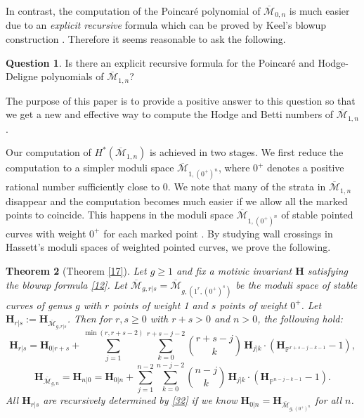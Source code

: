 \documentclass[11pt]{amsart}
\numberwithin{equation}{section}
\newtheorem{theo}{Theorem}[section]
\theoremstyle{definition}
\newtheorem{ques}[theo]{Question}
\newcommand{\PP}{\mathbb{P}}
\newcommand{\bH}{\mathbf{H}}
\def\cM{{\mathcal M}}
\def\beq{\begin{equation}}
\def\eeq{\end{equation}}
\def\bcM{\overline{\cM}}
\begin{document}
In contrast, the computation of the Poincar\'e polynomial of $\bcM_{0,n}$ is much easier due to an \emph{explicit recursive} formula \cite[(4.12)]{Manin} which can be proved by Keel's blowup construction \cite{Keel}.
Therefore it seems reasonable to ask the following.
\begin{ques}
    Is there an explicit recursive formula for the Poincar\'e and Hodge-Deligne polynomials of $\bcM_{1,n}$?
\end{ques}
The purpose of this paper is to provide a positive answer to this question so that we get a new and effective way to compute the Hodge and Betti numbers of $\bcM_{1,n}$. 

\medskip

Our computation of $H^*(\bcM_{1,n})$ is achieved in two stages. 
We first reduce the computation to a simpler moduli space $\bcM_{1,(0^+)^n}$, where $0^+$ denotes a positive rational number sufficiently close to $0$.  
We note that many of the strata in $\bcM_{1,n}$ disappear and the computation becomes much easier if we allow all the marked points to coincide. This happens in the moduli space $\bcM_{1,(0^+)^n}$ of stable pointed curves with weight $0^+$ for each marked point \cite{Hst}. 
By studying wall crossings in Hassett's moduli spaces of weighted pointed curves, we prove the following.
\begin{theo}[Theorem \ref{17}] Let $g\ge 1$ and fix a motivic invariant $\bH$ satisfying the blowup formula \eqref{12}. 
Let $\bcM_{g,r|s}=\bcM_{g,(1^r,(0^+)^s)}$ be the moduli space of stable curves of genus $g$ with $r$ points of weight 1 and $s$ points of weight $0^+$. Let $\bH_{r|s}:=\bH_{\bcM_{g,r|s}}$. Then for $r,s\ge 0$ with $r+s>0$ and $n>0$, the following hold:
   \beq\label{32} \bH_{r|s} = \bH_{0|r+s} + \sum_{j=1}^{\min(r,r+s-2)} \sum_{k=0}^{r+s-j-2} \binom{r+s-j}{k}\, \bH_{j|k}  \cdot (\bH_{\PP^{r+s-j-k-1}}-1),\eeq
   \beq\label{33} \bH_{\bcM_{g,n}}= \bH_{n|0} = \bH_{0|n} + \sum_{j=1}^{n-2} \sum_{k=0}^{n-j-2} \binom{n-j}{k}\, \bH_{j|k} \cdot (\bH_{\PP^{n-j-k-1}}-1).\eeq
All $\bH_{r|s}$ are recursively determined by \eqref{32} if we know $\bH_{0|n}=\bH_{\bcM_{g,(0^+)^n}}$ for all $n$.   
\end{theo}
\end{document}
